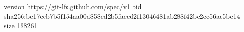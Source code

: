 version https://git-lfs.github.com/spec/v1
oid sha256:bc17eeb7b5f154aa00d858ed2b5faecd2f13046481ab288f42bc2cc56ac5be14
size 188261
